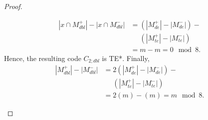 \documentclass[10pt,a4paper]{amsart}
\begin{document}
\begin{proof}
\begin{itemize}
        \begin{equation}
        \begin{split}
        |x \cap M_{dbl}^+|-|x \cap M_{dbl}^-|
        &=\left(|M_{de}^+|-|M_{de}^-|\right)-\\
        &\phantom{{}=}\left(|M_{te}^+|-|M_{te}^-|\right)\\
        &=m-m = 0\mod{8}.
        \end{split}
        \end{equation}
        Hence, the resulting code $C_{2;dbl}$ is TE*. Finally, 
        \begin{equation}
        \begin{split}
            |M_{dbl}^+|-|M_{dbl}^-|&=2\left(|M_{de}^+|-|M_{de}^-|\right)-\\
            &\phantom{{}=}\left(|M_{te}^+|-|M_{te}^-|\right)\\
            &= 2(m)-(m) = m\mod{8}.
        \end{split}
        \end{equation}
    \end{itemize}
\end{proof}
\end{document}
